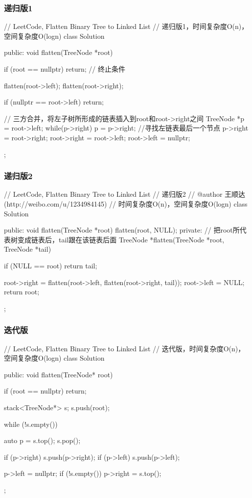 \subsubsection{递归版1}
\begin{Code}
// LeetCode, Flatten Binary Tree to Linked List
// 递归版1，时间复杂度O(n)，空间复杂度O(logn)
class Solution {
public:
    void flatten(TreeNode *root) {
        if (root == nullptr) return;  // 终止条件

        flatten(root->left);
        flatten(root->right);

        if (nullptr == root->left) return;

        // 三方合并，将左子树所形成的链表插入到root和root->right之间
        TreeNode *p = root->left;
        while(p->right) p = p->right; //寻找左链表最后一个节点
        p->right = root->right;
        root->right = root->left;
        root->left = nullptr;
    }
};
\end{Code}


\subsubsection{递归版2}
\begin{Code}
// LeetCode, Flatten Binary Tree to Linked List
// 递归版2
// @author 王顺达(http://weibo.com/u/1234984145)
// 时间复杂度O(n)，空间复杂度O(logn)
class Solution {
public:
    void flatten(TreeNode *root) {
        flatten(root, NULL);
    }
private:
    // 把root所代表树变成链表后，tail跟在该链表后面
    TreeNode *flatten(TreeNode *root, TreeNode *tail) {
        if (NULL == root) return tail;

        root->right = flatten(root->left, flatten(root->right, tail));
        root->left = NULL;
        return root;
    }
};
\end{Code}


\subsubsection{迭代版}
\begin{Code}
// LeetCode, Flatten Binary Tree to Linked List
// 迭代版，时间复杂度O(n)，空间复杂度O(logn)
class Solution {
public:
    void flatten(TreeNode* root) {
        if (root == nullptr) return;

        stack<TreeNode*> s;
        s.push(root);

        while (!s.empty()) {
            auto p = s.top();
            s.pop();

            if (p->right)
                s.push(p->right);
            if (p->left)
                s.push(p->left);

            p->left = nullptr;
            if (!s.empty())
                p->right = s.top();
        }
    }
};
\end{Code}


